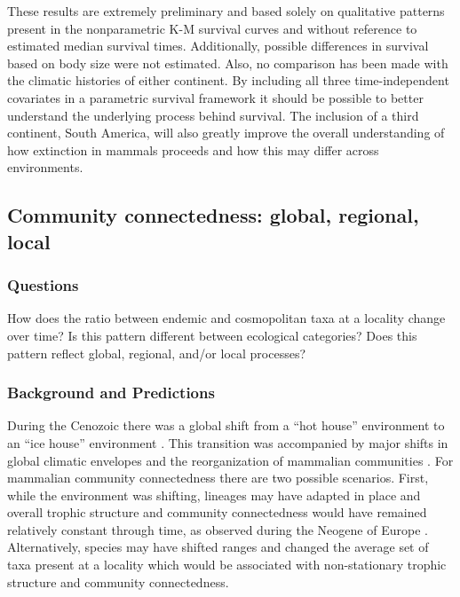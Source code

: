 \documentclass[12pt,letterpaper]{article}
\begin{document}
These results are extremely preliminary and based solely on qualitative patterns present in the nonparametric K-M survival curves and without reference to estimated median survival times. Additionally, possible differences in survival based on body size were not estimated. Also, no comparison has been made with the climatic histories of either continent. By including all three time-independent covariates in a parametric survival framework it should be possible to better understand the underlying process behind survival. The inclusion of a third continent, South America, will also greatly improve the overall understanding of how extinction in mammals proceeds and how this may differ across environments.


\subsection{Community connectedness: global, regional, local} \label{sec:mamcom}

\subsubsection{Questions} \label{sec:mamcomques}
How does the ratio between endemic and cosmopolitan taxa at a locality change over time? Is this pattern different between ecological categories? Does this pattern reflect global, regional, and/or local processes? 

\subsubsection{Background and Predictions} \label{sec:mamcomback}
During the Cenozoic there was a global shift from a ``hot house'' environment to an ``ice house'' environment \citep{Zachos2008,Zachos2001}. This transition was accompanied by major shifts in global climatic envelopes and the reorganization of mammalian communities \citep{Janis1993a,Fortelius2002,Blois2009,Alroy2000g,Figueirido2012}. For mammalian community connectedness there are two possible scenarios. First, while the environment was shifting, lineages may have adapted in place and overall trophic structure and community connectedness would have remained relatively constant through time, as observed during the Neogene of Europe \citep{Jernvall2004}. Alternatively, species may have shifted ranges and changed the average set of taxa present at a locality which would be associated with non-stationary trophic structure and community connectedness.
\end{document}
